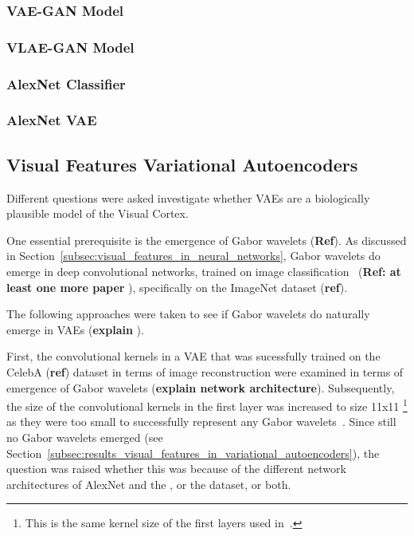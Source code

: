 \subsubsection{VAE-GAN Model}

\subsubsection{VLAE-GAN Model}

\subsubsection{AlexNet Classifier}

\subsubsection{AlexNet VAE}



\subsection{Visual Features Variational Autoencoders}\label{subsec:visual-features-variational-autoencoders}
Different questions were asked investigate whether \acp{VAE} are a biologically plausible model of the Visual Cortex.

One essential prerequisite is the emergence of Gabor wavelets (\textbf{Ref}).
As discussed in Section~\ref{subsec:visual_features_in_neural_networks}, Gabor wavelets do emerge in deep convolutional networks, trained on image classification~\citep{krizhevsky2012imagenet} (\textbf{Ref: at least one more paper }), specifically on the ImageNet dataset (\textbf{ref}).\par
The following approaches were taken to see if Gabor wavelets do naturally emerge in \acp{VAE} (\textbf{explain }).\par
First, the convolutional kernels in a \ac{VAE} that was sucessfully trained on the CelebA (\textbf{ref}) dataset in terms of image reconstruction were examined in terms of emergence of Gabor wavelets (\textbf{explain network architecture}).
Subsequently, the size of the convolutional kernels in the first layer was increased to size 11x11 \footnote{This is the same kernel size of the first layers used in~\citet{krizhevsky2012imagenet}.} as they were too small to successfully represent any Gabor wavelets~\citep{han2019variational}.
Since still no Gabor wavelets emerged (see Section~\ref{subsec:results_visual_features_in_variational_autoencoders}), the question was raised whether this was because of the different network architectures of AlexNet and the , or the dataset, or both.

